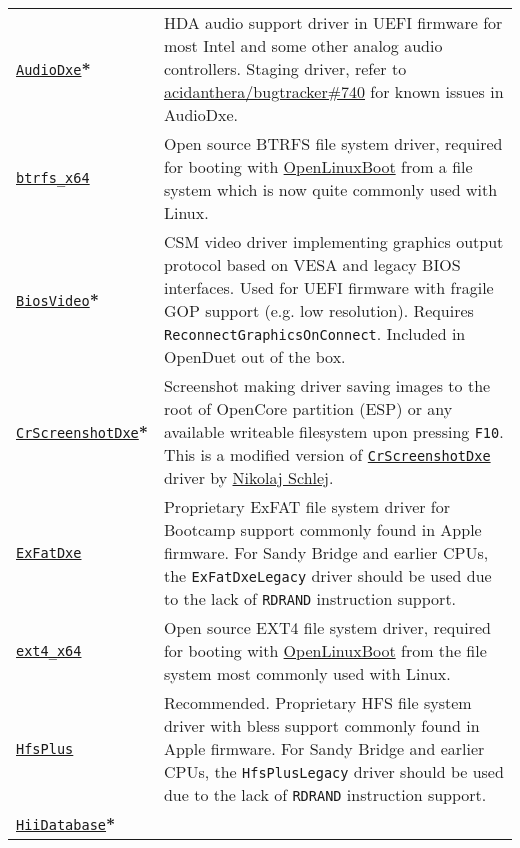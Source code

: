 \documentclass[]{article}
\begin{document}
\begin{longtable}{p{1.3in}p{5.55in}}
\href{https://github.com/acidanthera/OpenCorePkg}{\texttt{AudioDxe}}\textbf{*}
& HDA audio support driver in UEFI firmware for most Intel and some other analog audio controllers.
  Staging driver, refer to \href{https://github.com/acidanthera/bugtracker/issues/740}{acidanthera/bugtracker\#740}
  for known issues in AudioDxe. \\
\href{https://github.com/acidanthera/OcBinaryData}{\texttt{btrfs\_x64}}
& Open source BTRFS file system driver, required for booting with \hyperref[uefilinux]{OpenLinuxBoot}
  from a file system which is now quite commonly used with Linux. \\
\href{https://github.com/acidanthera/OpenCorePkg}{\texttt{BiosVideo}}\textbf{*}
& CSM video driver implementing graphics output protocol based on VESA and legacy
  BIOS interfaces. Used for UEFI firmware with fragile GOP support (e.g. low resolution).
  Requires \texttt{ReconnectGraphicsOnConnect}. Included in OpenDuet out of the box. \\
\href{https://github.com/acidanthera/OpenCorePkg}{\texttt{CrScreenshotDxe}}\textbf{*}
& Screenshot making driver saving images to the root of OpenCore partition (ESP) or
  any available writeable filesystem upon pressing \texttt{F10}.
  This is a modified version of \href{https://github.com/LongSoft/CrScreenshotDxe}{\texttt{CrScreenshotDxe}}
  driver by \href{https://github.com/NikolajSchlej}{Nikolaj Schlej}. \\
\href{https://github.com/acidanthera/OcBinaryData}{\texttt{ExFatDxe}}
& Proprietary ExFAT file system driver for Bootcamp support commonly found in Apple
  firmware. For Sandy Bridge and earlier CPUs, the \texttt{ExFatDxeLegacy} driver should be
  used due to the lack of \texttt{RDRAND} instruction support. \\
\href{https://github.com/acidanthera/OcBinaryData}{\texttt{ext4\_x64}}
& Open source EXT4 file system driver, required for booting with \hyperref[uefilinux]{OpenLinuxBoot}
  from the file system most commonly used with Linux. \\
\href{https://github.com/acidanthera/OcBinaryData}{\texttt{HfsPlus}}
& Recommended. Proprietary HFS file system driver with bless support commonly found in Apple
  firmware. For Sandy Bridge and earlier CPUs, the \texttt{HfsPlusLegacy} driver should be
  used due to the lack of \texttt{RDRAND} instruction support. \\
\href{https://github.com/acidanthera/audk}{\texttt{HiiDatabase}}\textbf{*}

\end{longtable}
\end{document}
